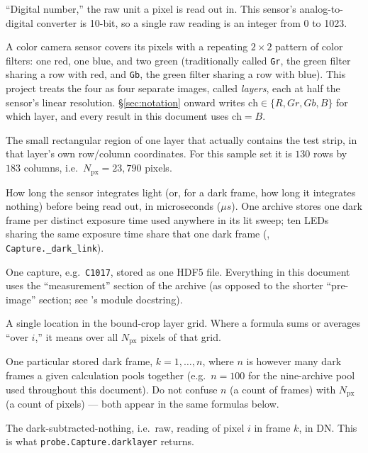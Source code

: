 \documentclass[11pt,a4paper]{article}
\newcommand{\file}[1]{\texttt{\seqsplit{#1}}}
\newcommand{\code}[1]{\texttt{#1}}
\begin{document}
\begin{description}[leftmargin=2.2cm,style=nextline]
\item[DN] ``Digital number,'' the raw unit a pixel is read out in. This
  sensor's analog-to-digital converter is 10-bit, so a single raw reading is
  an integer from 0 to 1023.
\item[Bayer layer] A color camera sensor covers its pixels with a repeating
  $2\times2$ pattern of color filters: one red, one blue, and two green
  (traditionally called \code{Gr}, the green filter sharing a row with red,
  and \code{Gb}, the green filter sharing a row with blue). This project
  treats the four as four separate images, called \emph{layers}, each at
  half the sensor's linear resolution. \S\ref{sec:notation} onward writes
  $\mathrm{ch} \in \{R, Gr, Gb, B\}$ for which layer, and every result in
  this document uses $\mathrm{ch} = B$.
\item[Bound-crop layer grid] The small rectangular region of one layer that
  actually contains the test strip, in that layer's own row/column
  coordinates. For this sample set it is $130$ rows by $183$ columns, i.e.\
  $N_{\mathrm{px}} = 23{,}790$ pixels.
\item[Exposure] How long the sensor integrates light (or, for a dark frame,
  how long it integrates nothing) before being read out, in microseconds
  ($\mu s$). One archive stores one dark frame per distinct exposure time
  used anywhere in its lit sweep; ten LEDs sharing the same exposure time
  share that one dark frame (\file{probe.py}, \code{Capture.\_dark\_link}).
\item[Archive / sample] One capture, e.g.\ \code{C1017}, stored as one HDF5
  file. Everything in this document uses the ``measurement'' section of the
  archive (as opposed to the shorter ``pre-image'' section; see
  \file{probe.py}'s module docstring).
\item[Pixel index $i$] A single location in the bound-crop layer grid.
  Where a formula sums or averages ``over $i$,'' it means over all
  $N_{\mathrm{px}}$ pixels of that grid.
\item[Frame index $k$] One particular stored dark frame, $k = 1, \dots, n$,
  where $n$ is however many dark frames a given calculation pools together
  (e.g.\ $n = 100$ for the nine-archive pool used throughout this document).
  Do not confuse $n$ (a count of frames) with $N_{\mathrm{px}}$ (a count of
  pixels) --- both appear in the same formulas below.
\item[$d_i(k)$] The dark-subtracted-nothing, i.e.\ raw, reading of pixel $i$
  in frame $k$, in DN. This is what \code{probe.Capture.darklayer} returns.
\end{description}
\end{document}

